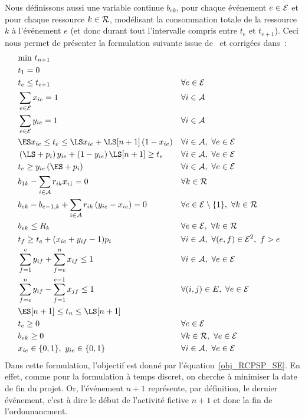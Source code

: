 Nous définissons aussi une variable continue $b_{ek}$, pour chaque
événement $e \in {\cal E}$ et pour chaque ressource $k \in {\cal R}$, modélisant
la consommation totale de la ressource $k$ à l'événement $e$ (et
donc durant tout l'intervalle compris entre $t_e$ et $t_{e+1}$).
Ceci nous permet de présenter la formulation
suivante issue de~\cite{modele_RCPSP} et corrigées dans~\cite{ABKKLM}: 
{\small
\begin{align} 
& \text{min } t_{n+1}
\label{obj_RCPSP_SE}\\ 
& t_1 =0 & & \label{t0_RCPSP_SE}\\ 
&t_e \le
t_{e+1} & & \forall e \in {\cal E} \label{ordre_RCPSP_SE}\\
&\sum_{e\in {\cal E}} x_{ie} =1 & & \forall i \in \A
\label{start_RCPSP_SE}\\ 
&\sum_{e\in {\cal E}} y_{ie} =1 & &
\forall i \in \A\label{end_RCPSP_SE}\\ 
&\ES x_{ie} \le t_e \le \LS
x_{ie}+\LS[n+1]\left(1-x_{ie}\right) & & \forall i \in \A,\ \forall
e \in {\cal E} \label{twx_RCPSP_SE}\\ 
&\left(\LS+p_i\right)y_{ie}
+\left(1-y_{ie}\right)\LS[n+1] \ge t_e & & \forall i \in \A ,\
\forall e \in {\cal E} \label{twy1_RCPSP_SE}\\ 
& t_e \ge
y_{ie}\left(\ES+p_i\right) & & \forall i \in \A ,\ \forall e \in
{\cal E} \label{twy2_RCPSP_SE}\\ 
&b_{1k} - \sum_{i \in \A}
r_{ik}x_{i1}=0 & & \forall k \in {\cal R} \label{res0_RCPSP_SE}\\
& b_{ek} - b_{e-1,k} + \sum_{i\in \A}r_{ik}
\left(y_{ie}-x_{ie}\right)=0 & & \forall e \in {\cal E}
\setminus\{1\},\ \forall k \in {\cal R} \label{resCons_RCPSP_SE}\\ 
&
b_{ek} \le R_k & & \forall e \in {\cal E},\ \forall k\in {\cal R}
\label{res_RCPSP_SE}\\
 &t_f \ge t_e + (x_{ie} + y_{if} -1) p_i & &
\forall i \in \A,\ \forall (e,f) \in {\cal E}^2,\ f>e
\label{dur_RCPSP_SE}\\ 
&\sum_{f=1}^e y_{if} +\sum_{f=e}^n x_{if}
\le 1 & & \forall i \in \A,\ \forall e \in {\cal E}
\label{xby_RCPSP_SE}\\
 &\sum_{f=e}^n y_{if} - \sum_{f=1}^{e-1}
x_{jf} \le 1 & & \forall (i,j) \in E,\ \forall e \in {\cal E}
\label{prec_RCPSP_SE}\\ 
& \ES[n+1] \le t_n \le \LS[n+1]&
&\label{Btn_RCPSP_SE}\\ 
&t_e \ge 0 & & \forall e \in {\cal E}
\label{Bte_RCPSP_SE}\\ 
& b_{ek} \ge 0 & & \forall k \in {\cal R},\
\forall e \in {\cal E} \label{Bbek_RCPSP_SE}\\ 
&x_{ie} \in
\{0,1\},\ y_{ie} \in \{0,1\} & & \forall i \in \A,\ \forall e \in
{\cal E} \label{Bxy_RCPSP_SE} \end{align}
 }
Dans cette formulation, l'objectif est donné par
l'équation~\eqref{obj_RCPSP_SE}. En effet, comme pour la
formulation à temps discret, on cherche à minimiser la date de fin
du projet. Or, l'événement $n+1$ représente, par définition, le
dernier événement, c'est à dire le début de l'activité fictive $n+1$
et donc la fin de l'ordonnancment.

